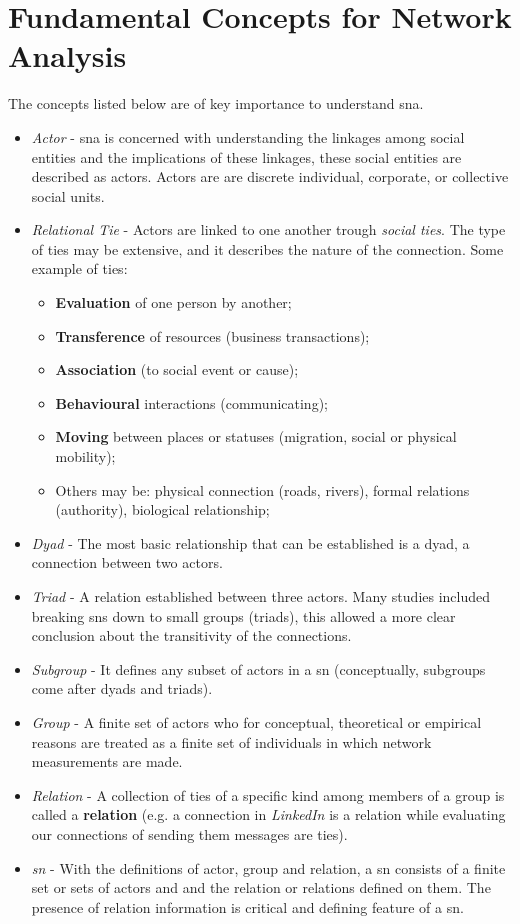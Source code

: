 \section{Fundamental Concepts for Network Analysis}

The concepts listed below are of key importance to understand \gls{sna}.\cite{wasserman1994social}

\begin{itemize}
    \item \emph{Actor} - \gls{sna} is concerned with understanding the linkages among social entities and the implications of these linkages, these social entities are described as actors. Actors are are discrete individual, corporate, or collective social units.
    \item \emph{Relational Tie} - Actors are linked to one another trough \textit{social ties}. The type of ties may be extensive, and it describes the nature of the connection. Some example of ties:
        \begin{itemize}
            \item \textbf{Evaluation} of one person by another;
            \item \textbf{Transference} of resources (business transactions);
            \item \textbf{Association} (to social event or cause);
            \item \textbf{Behavioural} interactions (communicating);
            \item \textbf{Moving} between places or statuses (migration, social or physical mobility);
            \item Others may be: physical connection (roads, rivers), formal relations (authority), biological relationship;
        \end{itemize}
    \item \emph{Dyad} - The most basic relationship that can be established is a dyad, a connection between two actors.
    \item \emph{Triad} - A relation established between three actors. Many studies included breaking \glspl{sn} down to small groups (triads), this allowed a more clear conclusion about the transitivity of the connections.
    \item \emph{Subgroup} - It defines any subset of actors in a \gls{sn} (conceptually, subgroups come after dyads and triads).
    \item \emph{Group} - A finite set of actors who for conceptual, theoretical or empirical reasons are treated as a finite set of individuals in which network measurements are made.
    \item \emph{Relation} - A collection of ties of a specific kind among members of a group is called a \textbf{relation} (e.g. a connection in \textit{LinkedIn} is a relation while evaluating our connections of sending them messages are ties).
    \item \emph{\gls{sn}} - With the definitions of actor, group and relation, a \gls{sn} consists of a finite set or sets of actors and
    and the relation or relations defined on them. The presence of relation information is critical and defining feature of a \gls{sn}.
\end{itemize}

